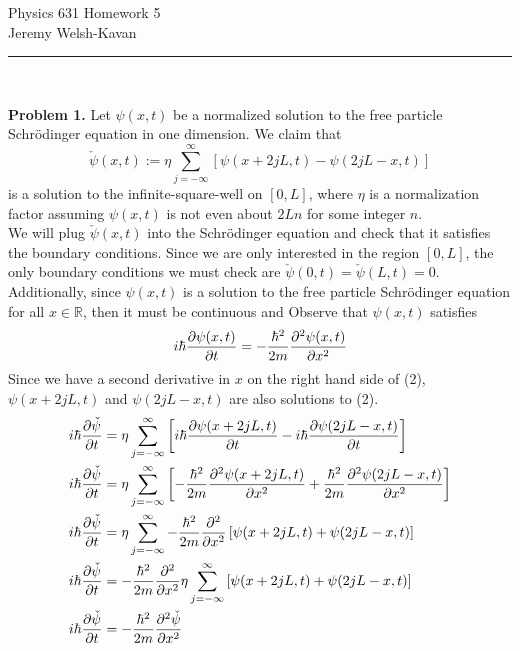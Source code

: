 \documentclass[]{book}
\begin{document}
\begin{center}
{\Large Physics 631 Homework 5}\\
{Jeremy Welsh-Kavan}\\
\end{center}
\vspace{0.2 cm}
\begin{center}
\noindent\rule{15cm}{0.4pt} \\
\end{center}

{\bf Problem 1.} Let $\psi(x,t)$ be a normalized solution to the free particle Schr{\"o}dinger equation in one dimension. We claim that
\begin{equation}\label{eq1}
\check{\psi}(x,t):=\eta\sum_{j=-\infty}^{\infty}\left[\psi(x+2jL,t)-\psi(2jL-x,t)\right]
\end{equation}
is a solution to the infinite-square-well on $[0,L]$, where $\eta$ is a normalization factor assuming $\psi(x,t)$ is not even about $2Ln$ for some integer $n$. \\
We will plug $\check{\psi}(x,t)$ into the Schr{\"o}dinger equation and check that it satisfies the boundary conditions. Since we are only interested in the region $[0,L]$, the only boundary conditions we must check are $\check{\psi}(0,t)=\check{\psi}(L,t)=0$. Additionally, since $\psi(x,t)$ is a solution to the free particle Schr{\"o}dinger equation for all $x\in\mathbb{R}$, then it must be continuous and 
Observe that $\psi(x,t)$ satisfies
\begin{equation}\label{eq2}
i\hbar\pdv{\psi(x,t)}{t}=-\frac{\hbar^2}{2m}\pdv[2]{\psi(x,t)}{x}
\end{equation}
Since we have a second derivative in $x$ on the right hand side of (2), $\psi(x+2jL,t)$ and $\psi(2jL-x,t)$ are also solutions to (2).
\begin{equation}\label{eq3}
\begin{split}
i\hbar\pdv{\check{\psi}}{t} &= \eta\sum_{j=-\infty}^{\infty}\left[i\hbar\pdv{\psi(x+2jL,t)}{t}-i\hbar\pdv{\psi(2jL-x,t)}{t}\right] \\
i\hbar\pdv{\check{\psi}}{t} &= \eta\sum_{j=-\infty}^{\infty}\left[-\frac{\hbar^2}{2m}\pdv[2]{\psi(x+2jL,t)}{x}+\frac{\hbar^2}{2m}\pdv[2]{\psi(2jL-x,t)}{x}\right] \\
i\hbar\pdv{\check{\psi}}{t} &= \eta\sum_{j=-\infty}^{\infty}-\frac{\hbar^2}{2m}\pdv[2]{x}\left[\psi(x+2jL,t)+\psi(2jL-x,t)\right] \\
i\hbar\pdv{\check{\psi}}{t} &= -\frac{\hbar^2}{2m}\pdv[2]{x}\eta\sum_{j=-\infty}^{\infty}\left[\psi(x+2jL,t)+\psi(2jL-x,t)\right] \\
i\hbar\pdv{\check{\psi}}{t} &=-\frac{\hbar^2}{2m}\pdv[2]{\check{\psi}}{x} \\
\end{split}
\end{equation}
\end{document}
